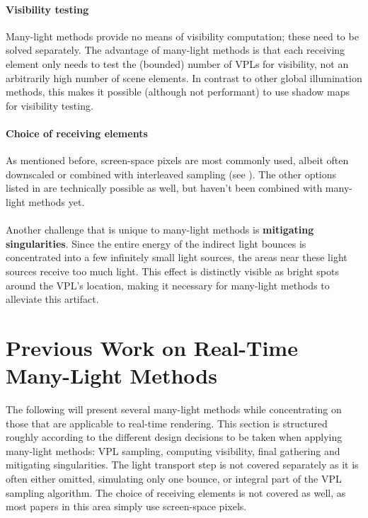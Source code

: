 \paragraph{Visibility testing}
Many-light methods provide no means of visibility computation; these need to be solved separately. The advantage of many-light methods is that each receiving element only needs to test the (bounded) number of VPLs for visibility, not an arbitrarily high number of scene elements. In contrast to other global illumination methods, this makes it possible (although not performant) to use shadow maps for visibility testing.

\paragraph{Choice of receiving elements}
As mentioned before, screen-space pixels are most commonly used, albeit often downscaled or combined with interleaved sampling (see ). The other options listed in  are technically possible as well, but haven't been combined with many-light methods yet.
\\
\\
Another challenge that is unique to many-light methods is \textbf{mitigating singularities}. Since the entire energy of the indirect light bounces is concentrated into a few infinitely small light sources, the areas near these light sources receive too much light. This effect is distinctly visible as bright spots around the VPL's location, making it necessary for many-light methods to alleviate this artifact.



\section{Previous Work on Real-Time Many-Light Methods}
\label{sec:intro:relatedWorkManyLight}

The following will present several many-light methods while concentrating on those that are applicable to real-time rendering. This section is structured roughly according to the different design decisions to be taken when applying many-light methods: VPL sampling, computing visibility, final gathering and mitigating singularities. The light transport step is not covered separately as it is often either omitted, simulating only one bounce, or integral part of the VPL sampling algorithm. The choice of receiving elements is not covered as well, as most papers in this area simply use screen-space pixels.

